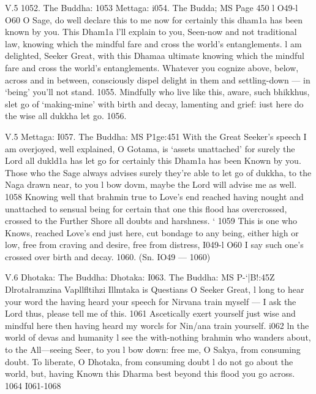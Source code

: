    
   
   V.5
   1052.
   The Buddha:
   1053
   Mettaga:
   i054.
   The Budda;
   MS Page 450
   l O49-l O60
   O Sage, do well declare this to me now
   for certainly this dham1a has been known by you.
   This Dham1a l'll explain to you,
   Seen-now and not traditional law,
   knowing which the mindful fare
   and cross the world's entanglements.
   l am delighted, Seeker Great,
   with this Dhamaa ultimate
   knowing which the mindful fare
   and cross the world's entanglements.
   Whatever you cognize above,
   below, across and in between,
   consciously dispel delight in them
   and settling-down — in `being' you'll not stand. 1055.
   Mindfully who live like this, aware,
   such bhikkhus, slet go of `making-mine'
   with birth and decay, lamenting and grief:
   iust here do the wise all dukkha let go. 1056.
   
   
   
   V.5
   Mettaga:
   I057.
   The Buddha:
   MS P1ge:451
   With the Great Seeker's speech I am overjoyed,
   well explained, O Gotama, is `assets unattached'
   for surely the Lord all dukld1a has let go
   for certainly this Dham1a has been Known by you.
   Those who the Sage always advises
   surely they're able to let go of dukkha,
   to the Naga drawn near, to you l bow dovm,
   maybe the Lord will advise me as well. 1058
   Knowing well that brahmin true to Love's end reached
   having nought and unattached to sensual being
   for certain that one this ﬂood has overcrossed,
   crossed to the Further Shore all doubts and harshness.
   ` 1059
   This is one who Knows, reached Love's end just here,
   cut bondage to any being, either high or low,
   free from craving and desire, free from distress,
   I049-l O60
   I say such one's crossed over birth and decay. 1060.
   (Sn. IO49 — 1060)
   
   
   
   V.6
   Dhotaka:
   The Buddha:
   Dhotaka:
   I063.
   The Buddha:
   MS P-`|B!:45Z
   Dlrotalramzina Vapllﬂtihzi
   Illmtaka is Questians
   O Seeker Great, l long to hear your word
   the having heard your speech
   for Nirvana train myself —
   I ask the Lord thus, please tell me of this. 1061
   Ascetically exert yourself
   just wise and mindful here
   then having heard my worcls
   for Nin/ana train yourself. i062
   ln the world of devas and humanity l see
   the with-nothing brahmin who wanders about,
   to the All—seeing Seer, to you l bow down:
   free me, O Sakya, from consuming doubt.
   To liberate, O Dhotaka, from consuming doubt
   l do not go about the world,
   but, having Known this Dharma best
   beyond this ﬂood you go across. 1064
   I061-1068
   
